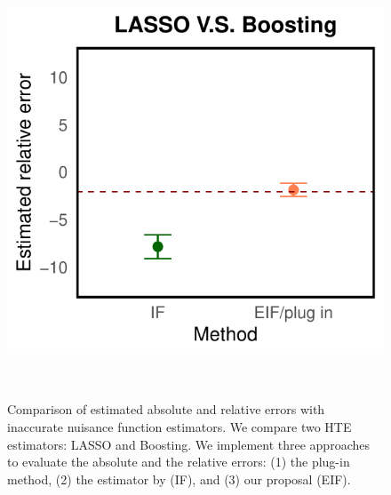 \documentclass[twoside]{article}
\newcommand{\1}{{\mathbbm{1}}}
\begin{document}
\begin{figure}[ht]
\begin{minipage}{0.15\textwidth}
        \end{minipage}
        \hspace{0.02cm}
            \begin{minipage}{0.15\textwidth}
                \centering
                \includegraphics[clip, trim = 0cm 0cm 0cm 0cm, width = \textwidth]{plot/inaccurate_nuisance_function_estimator_relative.pdf}
        \end{minipage}
        \\ 
        \caption{
        \small 
        Comparison of estimated absolute and relative errors with inaccurate nuisance function estimators.
        We compare two HTE estimators: LASSO and Boosting.
        We implement three approaches to evaluate the absolute and the relative errors: (1) the plug-in method, (2) the estimator by \cite{alaa2019validating} (IF), and (3) our proposal (EIF). 
}
\end{figure}
\end{document}
